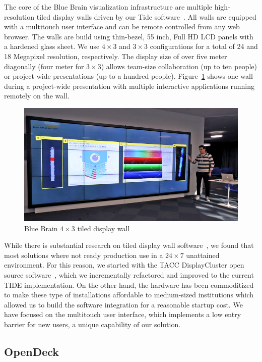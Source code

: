 \documentclass[10pt]{llncs}
\newcommand{\fig}[1]{Figure~\ref{#1}}
\begin{document}
The core of the Blue Brain visualization infrastructure are multiple
high-resolution tiled display walls driven by our Tide software~\cite{tide}. All
walls are equipped with a multitouch user interface and can be remote controlled
from any web browser. The walls are build using thin-bezel, 55 inch, Full HD LCD
panels with a hardened glass sheet. We use $4\times 3$ and $3\times 3$
configurations for a total of 24 and 18 Megapixel resolution, respectively. The
display size of over five meter diagonally (four meter for $3\times 3$) allows
team-size collaboration (up to ten people) or project-wide presentations (up to
a hundred people). \fig{fTDW} shows one wall during a project-wide presentation
with multiple interactive applications running remotely on the wall.

\begin{figure}[h!t]
  \includegraphics[width=\columnwidth]{images/tdw}
  \caption{\label{fTDW}Blue Brain $4\times 3$ tiled display wall}
\end{figure}

While there is substantial research on tiled display wall software~\cite{Sage,
Sage2, Omegalib, DK:11, JLMV:06, DisplayCluster}, we found that most solutions
where not ready production use in a $24\times 7$ unattained environment. For
this reason, we started with the TACC DisplayCluster open source
software~\cite{DisplayCluster}, which we incrementally refactored and improved
to the current TIDE implementation. On the other hand, the hardware has been
commoditized to make these type of installations affordable to medium-sized
institutions which allowed us to build the software integration for a reasonable
startup cost. We have focused on the multitouch user interface, which implements
a low entry barrier for new users, a unique capability of our solution.

\subsection{OpenDeck}
\end{document}
